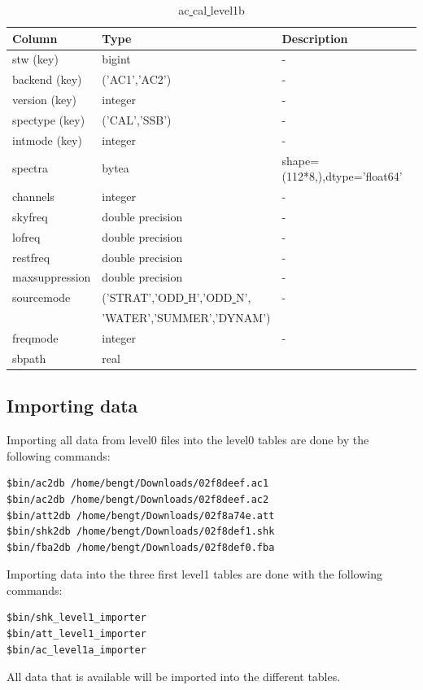 \documentclass[12pt]{article}
\begin{document}
\begin{table}[ht]
\caption{ac\underline{ }cal\underline{ }level1b}
\centering
\begin{tabular}{l l l}
\hline\hline
Column & Type & Description \\ [0.5ex]
\hline
 stw (key)           & bigint            &- \\
 backend (key)       & ('AC1','AC2')     & -\\
 version (key)       & integer           & -\\
 spectype (key)      & ('CAL','SSB')         & -\\
 intmode (key)       & integer           & -\\
 spectra        & bytea             & shape=(112*8,),dtype='float64'\\
 channels       & integer           & -\\
 skyfreq        & double precision  & -\\
 lofreq         & double precision  & -\\
 restfreq       & double precision  & -\\
 maxsuppression & double precision  & -\\
 sourcemode     & ('STRAT','ODD\underline{ }H','ODD\underline{ }N', & -\\
& 'WATER','SUMMER','DYNAM')   & \\
 freqmode       & integer           & -\\ 
 sbpath         & real              &\\[1ex]
\hline
\end{tabular}
\label{table:ac1a}
\end{table}

\clearpage
\newpage

\subsection{Importing data}
\label{sec:import}
Importing all data from level0 files into the level0 tables are done 
by the following commands:
\begin{verbatim}
$bin/ac2db /home/bengt/Downloads/02f8deef.ac1
$bin/ac2db /home/bengt/Downloads/02f8deef.ac2
$bin/att2db /home/bengt/Downloads/02f8a74e.att
$bin/shk2db /home/bengt/Downloads/02f8def1.shk
$bin/fba2db /home/bengt/Downloads/02f8def0.fba
\end{verbatim}
Importing data into the three first level1 tables are done 
with the following commands:
\begin{verbatim}
$bin/shk_level1_importer
$bin/att_level1_importer
$bin/ac_level1a_importer
\end{verbatim}
All data that is available will be imported 
into the different tables. 
\end{document}

